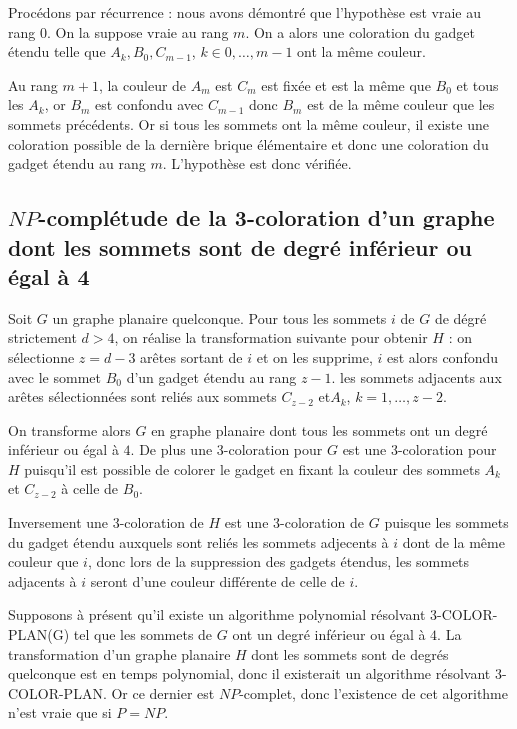 Procédons par récurrence : nous avons démontré que l'hypothèse est vraie au rang $0$. On la suppose
vraie au rang $m$. On a alors une coloration du gadget étendu telle que $A_k, B_0, C_{m-1}$, $k \in
0, \dots, m-1$ ont la même couleur. 

Au rang $m+1$, la couleur de $A_m$ est $C_m$ est fixée et est la même que $B_0$ et tous les $A_k$,
or $B_m$ est confondu avec $C_{m-1}$ donc $B_m$ est de la même couleur que les sommets précédents.
Or si tous les sommets ont la même couleur, il existe une coloration possible de la dernière brique
élémentaire et donc une coloration du gadget étendu au rang $m$. L'hypothèse est donc vérifiée.

\subsection{$NP$-complétude de la 3-coloration d'un graphe dont les sommets sont de degré inférieur
ou égal à 4}

Soit $G$ un graphe planaire quelconque. Pour tous les sommets $i$ de $G$ de dégré strictement $d
>4$, on réalise la transformation suivante pour obtenir $H$ : on sélectionne $z = d-3$ arêtes sortant de
$i$ et on les supprime, $i$ est alors confondu avec le sommet $B_0$ d'un gadget étendu au rang $z-1$.
les sommets adjacents aux arêtes sélectionnées sont reliés aux sommets $C_{z-2}$ et$A_k$, $k=1, \dots,
z-2$.

On transforme alors $G$ en graphe planaire dont tous les sommets ont un degré inférieur ou égal à
$4$. De plus une 3-coloration pour $G$ est une 3-coloration pour $H$ puisqu'il est possible de colorer
le gadget en fixant la couleur des sommets $A_k$ et $C_{z-2}$ à celle de $B_0$.

Inversement une 3-coloration de $H$ est une 3-coloration de $G$ puisque les sommets du gadget étendu
auxquels sont reliés les sommets adjecents à $i$ dont de la même couleur que $i$, donc lors de la
suppression des gadgets étendus, les sommets adjacents à $i$ seront d'une couleur différente de
celle de $i$.

Supposons à présent qu'il existe un algorithme polynomial résolvant 3-COLOR-PLAN(G) tel que les
sommets de $G$ ont un degré inférieur ou égal à $4$. La transformation d'un graphe planaire $H$ dont
les sommets sont de degrés quelconque est en temps polynomial, donc il existerait un algorithme
résolvant 3-COLOR-PLAN. Or ce dernier est $NP$-complet, donc l'existence de cet algorithme n'est
vraie que si $P = NP$.

